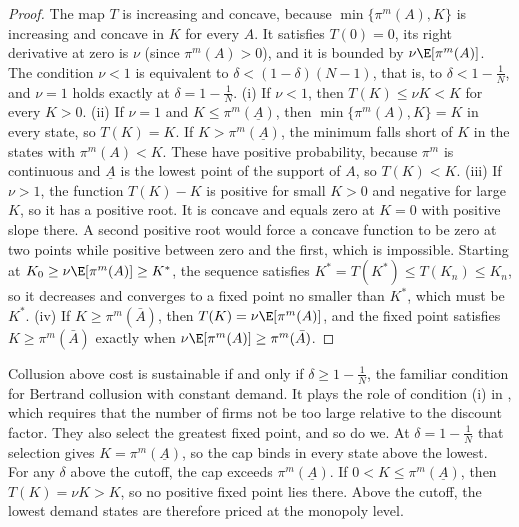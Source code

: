 \begin{proof}
The map $T$ is increasing and concave, because $\min\{\pi^m(A), K\}$ is increasing and concave in $K$ for every $A$. It
satisfies $T(0) = 0$, its right derivative at zero is $\nu$ (since $\pi^m(A) > 0$), and it is bounded by
$\nu\E[\pi^m(A)]$. The condition $\nu < 1$ is equivalent to $\delta < (1 - \delta)(N - 1)$, that is, to $\delta < 1 -
\frac{1}{N}$, and $\nu = 1$ holds exactly at $\delta = 1 - \frac{1}{N}$. (i) If $\nu < 1$, then $T(K) \le \nu K < K$ for every $K > 0$. (ii) If $\nu = 1$ and $K \le
\pi^m(\underline A)$, then $\min\{\pi^m(A), K\} = K$ in every state, so $T(K) = K$. If $K > \pi^m(\underline A)$, the
minimum falls short of $K$ in the states with $\pi^m(A) < K$. These have positive probability, because $\pi^m$ is
continuous and $\underline A$ is the lowest point of the support of $A$, so $T(K) < K$. (iii) If $\nu > 1$, the function
$T(K) - K$ is positive for small $K > 0$ and negative for large $K$, so it has a positive root. It is concave and equals
zero at $K = 0$ with positive slope there. A second positive root would force a concave function to be zero at two points
while positive between zero and the first, which is impossible. Starting at $K_0 \ge \nu\E[\pi^m(A)] \ge K^*$, the
sequence satisfies $K^* = T(K^*) \le T(K_n) \le K_n$, so it decreases and converges to a fixed point no smaller than
$K^*$, which must be $K^*$. (iv) If $K \ge \pi^m(\bar A)$, then $T(K) = \nu\E[\pi^m(A)]$, and the fixed point satisfies
$K \ge \pi^m(\bar A)$ exactly when $\nu\E[\pi^m(A)] \ge \pi^m(\bar A)$.
\end{proof}

Collusion above cost is sustainable if and only if $\delta \ge 1 - \frac{1}{N}$, the familiar condition for Bertrand
collusion with constant demand. It plays the role of condition (i) in \citet{RotembergSaloner1986}, which requires that
the number of firms not be too large relative to the discount factor. They also select the greatest fixed point, and so
do we. At $\delta = 1 - \frac{1}{N}$ that selection gives $K = \pi^m(\underline A)$, so the cap binds in every state
above the lowest. For any $\delta$ above the cutoff, the cap exceeds $\pi^m(\underline A)$. If $0 < K \le
\pi^m(\underline A)$, then $T(K) = \nu K > K$, so no positive fixed point lies there. Above the cutoff, the lowest demand states
are therefore priced at the monopoly level.

